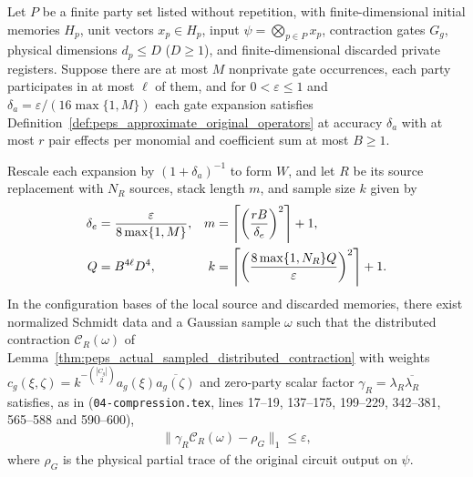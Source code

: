 \begin{lemma}
    \label{thm:peps_approximate_sampled_distributed_error}
    \leanok
    Let $P$ be a finite party set listed without repetition, with
    finite-dimensional initial memories $H_p$, unit vectors $x_p\in H_p$, input
    $\psi=\bigotimes_{p\in P}x_p$, contraction gates $G_g$, physical dimensions
    $d_p\le D$ ($D\ge 1$), and finite-dimensional discarded private registers.
    Suppose there are at most $M$ nonprivate gate occurrences, each party
    participates in at most $\ell$ of them, and for $0<\varepsilon\le 1$ and
    $\delta_a=\varepsilon/(16\max\{1,M\})$ each gate expansion satisfies
    Definition~\ref{def:peps_approximate_original_operators} at accuracy
    $\delta_a$ with at most $r$ pair effects per monomial and coefficient sum at
    most $B\ge 1$.

    Rescale each expansion by $(1+\delta_a)^{-1}$ to form $W$, and let $R$ be
    its source replacement with $N_R$ sources, stack length $m$,
    and sample size $k$ given by
    \begin{align}
        \delta_e & =\frac{\varepsilon}{8\max\{1,M\}},                                            &
        m        & =\left\lceil\left(\frac{rB}{\delta_e}\right)^2\right\rceil+1, \notag            \\
        Q        & =B^{4\ell}D^4,                                                                &
        k        & =\left\lceil\left(\frac{8\max\{1,N_R\}Q}{\varepsilon}\right)^2\right\rceil+1.
        \label{eq:peps_approximate_sampled_distributed_params}
    \end{align}
    In the configuration bases of the local source and discarded memories, there exist normalized
    Schmidt data and a Gaussian sample $\omega$ such that the distributed
    contraction $\mathcal C_R(\omega)$ of
    Lemma~\ref{thm:peps_actual_sampled_distributed_contraction} with weights
    $c_g(\xi,\zeta)=k^{-\binom{|C_g|}{2}}a_g(\xi)\overline{a_g(\zeta)}$ and
    zero-party scalar factor $\gamma_R=\lambda_R\overline{\lambda_R}$ satisfies,
    as in \cite[proof of Theorem~5.2]{OpenAI2026PolynomialPEPS}
    (\texttt{04-compression.tex}, lines 17--19, 137--175, 199--229,
    342--381, 565--588 and 590--600),
    \begin{align}
        \bigl\|\gamma_R\mathcal C_R(\omega)-\rho_G\bigr\|_1
        \leq\varepsilon,
        \label{eq:peps_approximate_sampled_distributed_error}
    \end{align}
    where $\rho_G$ is the physical partial trace of the original circuit output
    on $\psi$.
\end{lemma}

